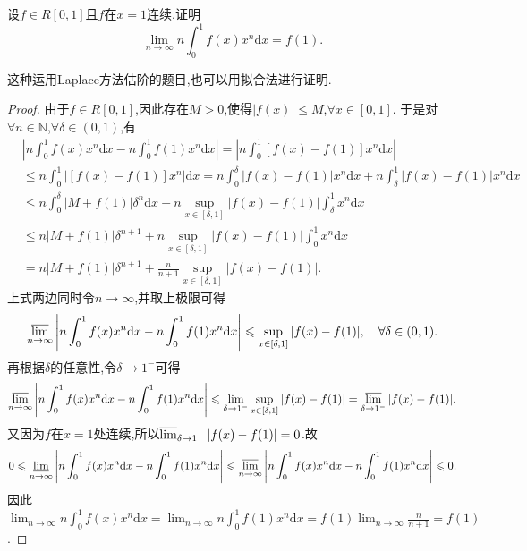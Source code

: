 \documentclass[../../main.tex]{subfiles}%
\begin{document}
\begin{example}\label{example4544166848}
设\(f\in R[0,1]\)且\(f\)在\(x = 1\)连续,证明
\[
\lim_{n \to \infty} n\int_{0}^{1} f(x)x^n \mathrm{d}x = f(1).
\]
\end{example}
\begin{note}
这种运用Laplace方法估阶的题目,也可以用拟合法进行证明.
\end{note}
\begin{proof}

由于\(f\in R[0,1]\),因此存在\(M > 0\),使得\(\vert f(x)\vert\leqslant M\),\(\forall x\in [0,1]\).
于是对\(\forall n\in\mathbb{N}\),\(\forall\delta\in(0,1)\),有
\begin{align*}
&\left\vert n\int_0^1 f(x)x^n \mathrm{d}x - n\int_0^1 f(1)x^n \mathrm{d}x\right\vert=\left\vert n\int_0^1 [f(x) - f(1)]x^n \mathrm{d}x\right\vert\\
&\leqslant n\int_0^1 \vert [f(x) - f(1)]x^n\vert \mathrm{d}x
=n\int_0^{\delta} \vert f(x) - f(1)\vert x^n \mathrm{d}x + n\int_{\delta}^1 \vert f(x) - f(1)\vert x^n \mathrm{d}x\\
&\leqslant n\int_0^{\delta} \vert M + f(1)\vert\delta^n \mathrm{d}x + n\sup_{x\in[\delta,1]}\vert f(x) - f(1)\vert\int_{\delta}^1 x^n \mathrm{d}x\\
&\leqslant n\vert M + f(1)\vert\delta^{n + 1} + n\sup_{x\in[\delta,1]}\vert f(x) - f(1)\vert\int_0^1 x^n \mathrm{d}x\\
&=n\vert M + f(1)\vert\delta^{n + 1} + \frac{n}{n + 1}\sup_{x\in[\delta,1]}\vert f(x) - f(1)\vert.
\end{align*}
上式两边同时令\(n\rightarrow\infty\),并取上极限可得
\[
\varlimsup_{n\rightarrow\infty}\left\vert n\int_0^1 f(x)x^n \mathrm{d}x - n\int_0^1 f(1)x^n \mathrm{d}x\right\vert\leqslant\sup_{x\in[\delta,1]}\vert f(x) - f(1)\vert, \quad\forall\delta\in(0,1).
\]
再根据\(\delta\)的任意性,令\(\delta\rightarrow 1^-\)可得
\[
\varlimsup_{n\rightarrow\infty}\left\vert n\int_0^1 f(x)x^n \mathrm{d}x - n\int_0^1 f(1)x^n \mathrm{d}x\right\vert\leqslant\lim_{\delta\rightarrow 1^-}\sup_{x\in[\delta,1]}\vert f(x) - f(1)\vert=\varlimsup_{\delta\rightarrow 1^-}\vert f(x) - f(1)\vert.
\]
又因为\(f\)在\(x = 1\)处连续,所以\(\varlimsup_{\delta\rightarrow 1^-}\vert f(x) - f(1)\vert = 0\).故
\[
0\leqslant\varliminf_{n\rightarrow\infty}\left\vert n\int_0^1 f(x)x^n \mathrm{d}x - n\int_0^1 f(1)x^n \mathrm{d}x\right\vert\leqslant\varlimsup_{n\rightarrow\infty}\left\vert n\int_0^1 f(x)x^n \mathrm{d}x - n\int_0^1 f(1)x^n \mathrm{d}x\right\vert\leqslant 0.
\]
因此$\lim_{n\rightarrow\infty}n\int_0^1 f(x)x^n \mathrm{d}x=\lim_{n\rightarrow\infty}n\int_0^1 f(1)x^n \mathrm{d}x = f(1)\lim_{n\rightarrow\infty}\frac{n}{n + 1}=f(1)$.

\end{proof}
\end{document}

